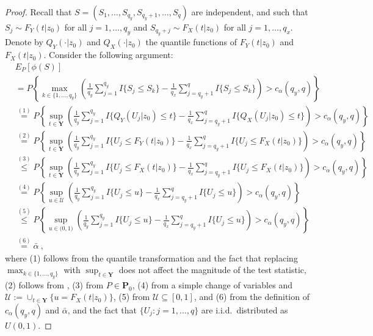 \documentclass[11pt]{article}
\numberwithin{equation}{section}
\begin{document}
\begin{proof}
Recall that $S = (S_1, \dots,S_{q_y},S_{q_y+1},\dots,S_{q})$ are independent, and such that $S_j \sim F_Y(t|z_{0})$ for all $j =1,\dots, q_y$ and $S_{q_y+j} \sim F_X(t|z_{0})$ for all $j=1,\dots, q_x$. Denote by $Q_Y(\cdot|z_{0})$ and $Q_X(\cdot|z_{0})$ the quantile functions of $F_Y(t|z_{0})$ and $ F_X(t|z_{0})$.
Consider the following argument:
{\small \begin{align*}
&E_P[ \phi (S)]  \\
&= P\left\lbrace \max_{k \in \{1,\dots,q_y\}} \left(\frac{1}{q_y}\sum_{j=1}^{q_y} I\{S_j \le S_k\}-\frac{1}{q_x}\sum_{j=q_y+1}^{q} I\{S_j \le  S_k\} \right) > c_{\alpha}(q_y,q) \right\rbrace  \\
&\overset{(1)}{=} P\left\lbrace \sup_{t\in\mathbf Y} \left(\frac{1}{q_y}\sum_{j=1}^{q_y} I\{Q_Y(U_j|z_{0}) \le t\}-\frac{1}{q_x}\sum_{j=q_y+1}^{q} I\{Q_X(U_j|z_{0}) \le t\} \right) > c_{\alpha}(q_y,q) \right\rbrace  \\
&\overset{(2)}{=} P\left\lbrace \sup_{t\in\mathbf Y} \left(\frac{1}{q_y}\sum_{j=1}^{q_y} I\{U_{j} \le F_Y(t|z_{0})\}-\frac{1}{q_x}\sum_{j=q_y+1}^{q} I\{U_{j} \le F_X(t|z_{0})\} \right) > c_{\alpha}(q_y,q) \right\rbrace \\
&\overset{(3)}{\leq}  P\left\lbrace \sup_{t\in\mathbf Y} \left(\frac{1}{q_y}\sum_{j=1}^{q_y} I\{U_{j} \le F_X(t|z_{0})\}-\frac{1}{q_x}\sum_{j=q_y+1}^{q} I\{U_{j} \le F_X(t|z_{0})\} \right) > c_{\alpha}(q_y,q) \right\rbrace  \\
&\overset{(4)}{=} P\left\lbrace \sup_{u\in \mathcal{U}} \left(\frac{1}{q_y}\sum_{j=1}^{q_y} I\{U_{j} \le u\}-\frac{1}{q_x}\sum_{j=q_y+1}^{q} I\{U_{j} \le u\} \right) > c_{\alpha}(q_y,q) \right\rbrace \\
&\overset{(5)}{\leq} P\left\lbrace \sup_{u\in\mathbf (0,1)} \left(\frac{1}{q_y}\sum_{j=1}^{q_y} I\{U_{j} \le u\}-\frac{1}{q_x}\sum_{j=q_y+1}^{q} I\{U_{j} \le u\} \right) > c_{\alpha}(q_y,q) \right\rbrace \\
&\overset{(6)}{=}\bar{\alpha}~,
\end{align*}}
where (1) follows from the quantile transformation and the fact that replacing $\max_{k \in \{1,\dots,q_y\}}$ with $\sup_{t\in \mathbf Y}$ does not affect the magnitude of the test statistic, (2) follows from  \citet[][Eq.\ 36]{pollard:02}, (3) from $P\in \mathbf P_0$, (4) from a simple change of variables and $\mathcal{U} := \cup_{t\in \mathbf Y}\{u =  F_X(t|z_{0}) \}$, (5) from $ \mathcal{U}\subseteq [0,1]$, and (6) from the definition of $c_{\alpha}(q_y,q)$ and $\bar{\alpha}$, and the fact that $\{U_{j}:j=1,\dots,q\}$ are i.i.d.\ distributed as $U( 0,1) $. 


\end{proof}
\end{document}
